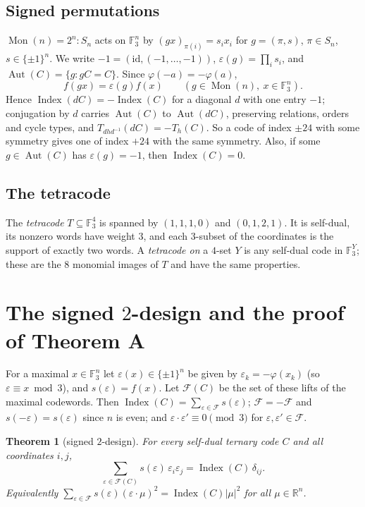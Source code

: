 \documentclass[11pt]{amsart}
\newtheorem{theorem}{Theorem}[section]
\theoremstyle{definition}
\newcommand{\F}{\mathbb{F}_3}
\newcommand{\Index}{\operatorname{Index}}
\newcommand{\Aut}{\operatorname{Aut}}
\newcommand{\Mon}{\operatorname{Mon}}
\newcommand{\cF}{\mathcal{F}}
\begin{document}
\subsection{Signed permutations}
$\Mon(n)=2^n{:}S_n$ acts on $\F^n$ by $(gx)_{\pi(i)}=s_ix_i$ for $g=(\pi,s)$, $\pi\in S_n$,
$s\in\{\pm1\}^n$. We write $-1=(\mathrm{id},(-1,\dots,-1))$, $\varepsilon(g)=\prod_is_i$, and
$\Aut(C)=\{g:gC=C\}$. Since $\varphi(-a)=-\varphi(a)$,
\begin{equation}\label{eq:fsign}
  f(gx)=\varepsilon(g)f(x)\qquad(g\in\Mon(n),\ x\in\F^n).
\end{equation}
Hence $\Index(dC)=-\Index(C)$ for a diagonal $d$ with one entry $-1$; conjugation by $d$ carries
$\Aut(C)$ to $\Aut(dC)$, preserving relations, orders and cycle types, and
$T_{dhd^{-1}}(dC)=-T_h(C)$. So a code of index $\pm24$ with some symmetry gives one of index $+24$
with the same symmetry. Also, if some $g\in\Aut(C)$ has $\varepsilon(g)=-1$, then $\Index(C)=0$.

\subsection{The tetracode}
The \emph{tetracode} $T\subseteq\F^4$ is spanned by $(1,1,1,0)$ and $(0,1,2,1)$. It is self-dual,
its nonzero words have weight $3$, and each $3$-subset of the coordinates is the support of exactly
two words. A \emph{tetracode on} a $4$-set $Y$ is any self-dual code in $\F^Y$; these are the
$8$ monomial images of $T$ and have the same properties.

\section{The signed \texorpdfstring{$2$}{2}-design and the proof of Theorem A}\label{sec:design}

For a maximal $x\in\F^n$ let $\varepsilon(x)\in\{\pm1\}^n$ be given by
$\varepsilon_k=-\varphi(x_k)$ (so $\varepsilon\equiv x\bmod 3$), and $s(\varepsilon)=f(x)$. Let
$\cF(C)$ be the set of these lifts of the maximal codewords. Then
$\Index(C)=\sum_{\varepsilon\in\cF}s(\varepsilon)$; $\cF=-\cF$ and $s(-\varepsilon)=s(\varepsilon)$
since $n$ is even; and $\varepsilon\cdot\varepsilon'\equiv0\pmod3$ for
$\varepsilon,\varepsilon'\in\cF$.

\begin{theorem}[signed $2$-design]\label{thm:design}
For every self-dual ternary code $C$ and all coordinates $i,j$,
\[
  \sum_{\varepsilon\in\cF(C)}s(\varepsilon)\,\varepsilon_i\varepsilon_j=\Index(C)\,\delta_{ij}.
\]
Equivalently $\sum_{\varepsilon\in\cF}s(\varepsilon)(\varepsilon\cdot\mu)^2=\Index(C)|\mu|^2$ for
all $\mu\in\mathbb R^n$.
\end{theorem}
\end{document}
